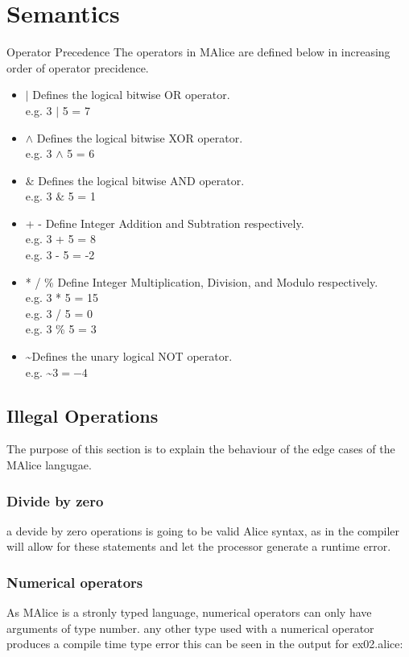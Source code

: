 \documentclass[a4wide, 10pt]{article}
\newcommand{\tab}{\hspace*{2em}}
\begin{document}
\section{Semantics}
Operator Precedence
The operators in MAlice are defined below in increasing order of operator precidence.
\begin{itemize}
	\item
	$|$ Defines the logical bitwise OR operator. 
	\\ \tab e.g. 3 $|$ 5 = 7
	\item
	$\land$ Defines the logical bitwise XOR operator. 
	\\ \tab e.g. 3 $\land$ 5 = 6
	\item
	$\&$ Defines the logical bitwise AND operator. 
	\\ \tab e.g. 3 $\&$ 5 = 1
	\item
	+ - Define Integer Addition and Subtration respectively. 
	\\ \tab e.g. 3 + 5 = 8 \\ \tab e.g. 3 - 5 = -2
	\item
	* / \% Define Integer Multiplication, Division, and Modulo respectively. 
	\\ \tab e.g. 3 * 5 = 15 \\ \tab e.g. 3 / 5 = 0 \\ \tab e.g. 3 \% 5 = 3
	\item
	\textasciitilde  Defines the unary logical NOT operator.
	\\ \tab e.g. \textasciitilde$ 3 = -4$
    
    
\end{itemize}

\subsection{Illegal Operations}
The purpose of this section is to explain the behaviour of the edge cases of the
MAlice langugae.

\subsubsection{Divide by zero}
a devide by zero operations is going to be valid Alice syntax, as in the compiler
will allow for these statements and let the processor generate a runtime error.


\subsubsection{Numerical operators}
As MAlice is a stronly typed language, numerical operators can only have 
arguments of type number. any other type used with a numerical operator produces
a compile time type error this can be seen in the output for ex02.alice:
\end{document}
